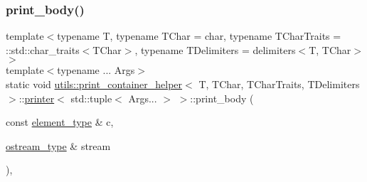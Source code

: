 \subsubsection{\texorpdfstring{print\_body()}{print\_body()}}
{\footnotesize\ttfamily template$<$typename T, typename T\+Char = char, typename T\+Char\+Traits = \+::std\+::char\+\_\+traits$<$\+T\+Char$>$, typename T\+Delimiters = delimiters$<$\+T, T\+Char$>$$>$ \\
template$<$typename ... Args$>$ \\
static void \mbox{\hyperlink{structutils_1_1print__container__helper}{utils\+::print\+\_\+container\+\_\+helper}}$<$ T, T\+Char, T\+Char\+Traits, T\+Delimiters $>$\+::\mbox{\hyperlink{structutils_1_1print__container__helper_1_1printer}{printer}}$<$ std\+::tuple$<$ Args... $>$ $>$\+::print\+\_\+body (\begin{DoxyParamCaption}\item[{const \mbox{\hyperlink{structutils_1_1print__container__helper_1_1printer_3_01std_1_1tuple_3_01_args_8_8_8_01_4_01_4_a1ca86cb16c37518fb257879ce8026459}{element\+\_\+type}} \&}]{c,  }\item[{\mbox{\hyperlink{structutils_1_1print__container__helper_1_1printer_3_01std_1_1tuple_3_01_args_8_8_8_01_4_01_4_a7a89933fa31d7a79f454cdf36211a73a}{ostream\+\_\+type}} \&}]{stream }\end{DoxyParamCaption})\hspace{0.3cm}{\ttfamily [inline]}, {\ttfamily [static]}}

\mbox{\label{structutils_1_1print__container__helper_1_1printer_3_01std_1_1tuple_3_01_args_8_8_8_01_4_01_4_aea264172a79f5fae5cbb74924bf1dd91}} 

